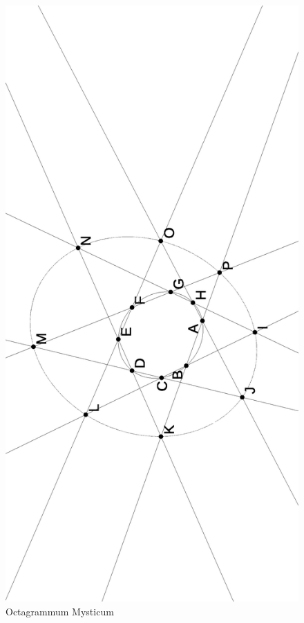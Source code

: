 \begin{figure}[!htb]
\centering
\includegraphics[scale=0.5,angle=270]{octa.eps}
\caption{Octagrammum Mysticum}\label{octa}
\end{figure}

